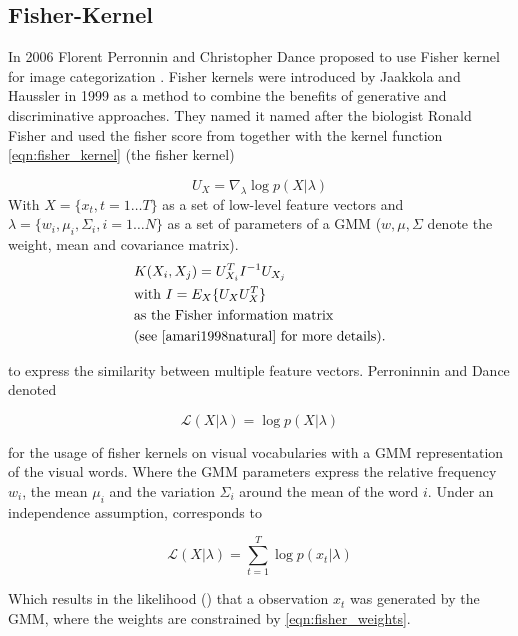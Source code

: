 \subsection{Fisher-Kernel}
\label{sec:fisher}

In 2006 Florent Perronnin and Christopher Dance proposed to use Fisher kernel for image categorization \cite{Perronnin2006}. Fisher kernels were introduced by Jaakkola and Haussler in 1999 as a method to combine the benefits of generative and discriminative approaches. They named it named after the biologist Ronald Fisher and used the fisher score from  together with the kernel function \ref{eqn:fisher_kernel} (the fisher kernel) 

\begin{equation}
U_X = \nabla_\lambda \log p(X|\lambda)
\label{eqn:fisher_score}
\end{equation}
With $X = \{x_t, t = 1 \dots T\}$ as a set of low-level feature vectors and $\lambda = \{w_i, \mu_i, \Sigma_i, i = 1 \dots N\}$ as a set of parameters of a \acf{GMM} ($w, \mu, \Sigma$ denote the weight, mean and covariance matrix).
\begin{align}
&K(X_i, X_j) = U_{X_i}^T I^{-1} U_{X_j}
\label{eqn:fisher_kernel} \\
\nonumber & \text{with } I = E_X\{U_X U_X^T\} \\
\nonumber & \text{as the Fisher information matrix }\\
\nonumber & \text{(see \cite{amari1998natural} for more details)}.
\end{align}

to express the similarity between multiple feature vectors. Perroninnin and Dance denoted

\begin{equation}
\mathcal{L} (X|\lambda) = \log p(X|\lambda)
\label{eqn:fisher:score2}
\end{equation}

for the usage of fisher kernels on visual vocabularies with a \ac{GMM} representation of the visual words. Where the \ac{GMM} parameters express the relative frequency $w_i$, the mean $\mu_i$ and the variation $\Sigma_i$ around the mean of the word $i$. Under an independence assumption,  corresponds to

\begin{equation}
\mathcal{L} (X|\lambda) = \sum_{t=1}^{T} \log p(x_t|\lambda)
\end{equation}

Which results in the likelihood () that a observation $x_t$ was generated by the \ac{GMM}, where the weights are constrained by \ref{eqn:fisher_weights}.


